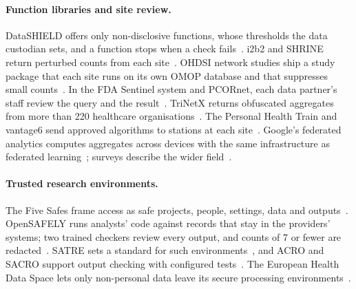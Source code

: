 \paragraph{Function libraries and site review.} DataSHIELD offers only
non-disclosive functions, whose thresholds the data custodian sets, and a
function stops when a check fails~\citep{gaye2014datashield,marcon2021orchestrating,datashield2026disclosure}.
i2b2 and SHRINE return perturbed counts from each
site~\citep{weber2009shared,murphy2010serving}. OHDSI network studies ship a
study package that each site runs on its own OMOP database and that suppresses
small counts~\citep{hripcsak2015observational,ohdsi2026network}. In the FDA
Sentinel system and PCORnet, each data partner's staff review the query and the
result~\citep{curtis2012design,platt2018fda,fleurence2014launching}. TriNetX
returns obfuscated aggregates from more than 220 healthcare
organisations~\citep{palchuk2023global}. The Personal Health Train and vantage6
send approved algorithms to stations at each
site~\citep{beyan2020distributed,moncadatorres2021vantage6,smits2022improved}.
Google's federated analytics computes aggregates across devices with the same
infrastructure as federated learning~\citep{ramage2020federated}; surveys
describe the wider field~\citep{elkordy2023federated,wang2022federated}.

\paragraph{Trusted research environments.} The Five Safes frame access as safe
projects, people, settings, data and outputs~\citep{desai2016five,green2023present}.
OpenSAFELY runs analysts' code against records that stay in the providers'
systems; two trained checkers review every output, and counts of 7 or fewer are
redacted~\citep{williamson2020factors,opensafely2026release,opensafely2023disclosure}.
SATRE sets a standard for such environments~\citep{satre2023standard}, and
ACRO and SACRO support output checking with configured
tests~\citep{preen2025multi}. The European Health Data Space lets only
non-personal data leave its secure processing environments~\citep{eu2025ehds}.

